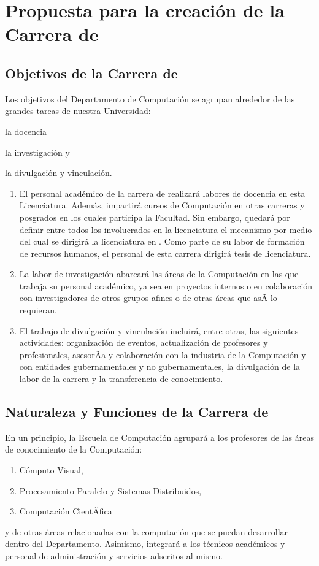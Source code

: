\section{Propuesta para la creación de la Carrera de \SchoolShortName}\label{sec:cs-prop-carr-cscomp}

\subsection{Objetivos de la Carrera de \SchoolShortName}
Los objetivos del Departamento de Computación se agrupan alrededor de las grandes tareas de nuestra Universidad:
\begin{inparaenum}[ a) ]
\item la docencia
\item la investigación y 
\item la divulgación y vinculación.
\end{inparaenum}

\begin{enumerate}
\item El personal académico de la carrera de \SchoolShortName realizará labores de docencia en esta Licenciatura. Además, impartirá cursos de Computación en otras carreras y posgrados en los cuales participa la Facultad. Sin embargo, quedará por definir entre todos los involucrados en la licenciatura el mecanismo por medio del cual se dirigirá la licenciatura en \SchoolShortName. Como parte de su labor de formación de recursos humanos, el personal de esta carrera dirigirá tesis de licenciatura.

\item La labor de investigación abarcará las áreas de la Computación en las que trabaja su personal académico, ya sea en proyectos internos o en colaboración con investigadores de otros grupos afines o de otras áreas que asÃ­ lo requieran.

\item El trabajo de divulgación y vinculación incluirá, entre otras, las siguientes actividades: organización de eventos, actualización de profesores y profesionales, asesorÃ­a y colaboración con la industria de la Computación y con entidades gubernamentales y no gubernamentales, la divulgación de la labor de la carrera y la transferencia de conocimiento.
\end{enumerate}

\subsection{Naturaleza y Funciones de la Carrera de \SchoolShortName}
En un principio, la Escuela de Computación agrupará a los profesores de las áreas de conocimiento de la Computación:
\begin{enumerate}[ a) ]
\item Cómputo Visual,
\item Procesamiento Paralelo y Sistemas Distribuidos,
\item Computación CientÃ­fica
\end{enumerate}
y de otras áreas relacionadas con la computación que se puedan desarrollar dentro del Departamento. Asimismo, integrará a los técnicos académicos y personal de administración y servicios adscritos al mismo.

